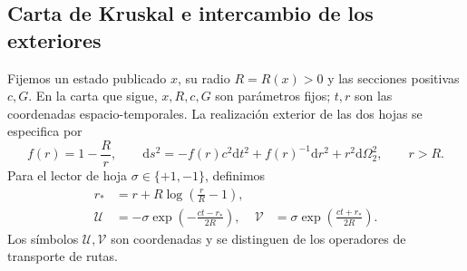 \subsection{Carta de Kruskal e intercambio de los exteriores}
\label{vii:subsec:kruskal-dos-hojas}

Fijemos un estado publicado \(x\), su radio \(R=R(x)>0\) y las
secciones positivas \(c,G\). En la carta que sigue, \(x,R,c,G\)
son parámetros fijos; \(t,r\) son las coordenadas espacio-temporales.
La realización exterior de las dos hojas se especifica por
\begin{equation}
 f(r)=1-\frac Rr,\qquad
 \mathrm ds^2=-f(r)c^2\mathrm dt^2+f(r)^{-1}\mathrm dr^2
                 +r^2\mathrm d\Omega_2^2,\qquad r>R.
 \label{vii:eq:metrica-exterior}
\end{equation}
Para el lector de hoja \(\sigma\in\{+1,-1\}\), definimos
\begin{align}
 r_*&=r+R\log\left(\frac rR-1\right),\\
 \mathcal U&=-\sigma\exp\left(-\frac{ct-r_*}{2R}\right),&
 \mathcal V&=\sigma\exp\left(\frac{ct+r_*}{2R}\right).
 \label{vii:eq:carta-kruskal}
\end{align}
Los símbolos \(\mathcal U,\mathcal V\) son coordenadas y se
distinguen de los operadores de transporte de rutas.


